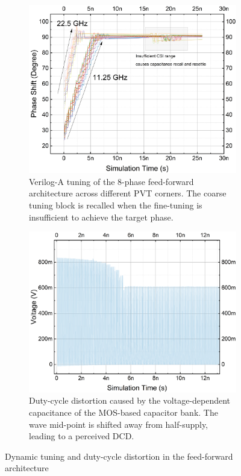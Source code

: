 \begin{figure}[htbp]
  \centering
  \begin{subfigure}[t]{0.45\linewidth}
    \centering
    \includegraphics[width=\linewidth]{figures/Results/FF_8out_3nm_idealswitches-Phase90_tuning_PVT_SomeN.png}
    \caption{Verilog-A tuning of the 8-phase feed-forward architecture across different PVT corners. The coarse tuning block is recalled when the fine-tuning is insufficient to achieve the target phase.}
    \label{fig:FF_8out_CSI_dynamicTuning_PVT}
  \end{subfigure}
  \hfill
  \begin{subfigure}[t]{0.45\linewidth}
    \centering
    \includegraphics[width=\linewidth]{figures/Results/FF_8out_PPNN-DCDWithCap.png}
    \caption{Duty-cycle distortion caused by the voltage-dependent capacitance of the MOS-based capacitor bank. The wave mid-point is shifted away from half-supply, leading to a perceived DCD.}
    \label{fig:FF_CapDCD}
  \end{subfigure}
  \caption{Dynamic tuning and duty-cycle distortion in the feed-forward architecture}
  \label{fig:FF_tuning_and_dcd}
\end{figure}

